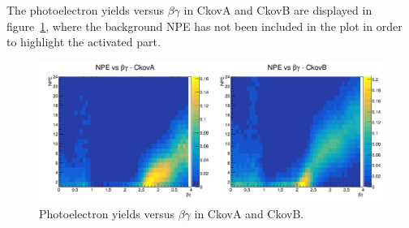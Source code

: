 The photoelectron yields versus $\beta\gamma$ in CkovA and CkovB are displayed in figure~\ref{fig:ckov_betagamma}, where the background NPE has not been included in the plot in order to highlight the activated part.






\begin{figure}[htb!]
  \begin{center}
    \includegraphics[width=0.90\columnwidth]{./03-Ckov/Figures/scatter_betagamma.png}
    \caption{Photoelectron yields versus $\beta\gamma$ in CkovA and CkovB.}
    \label{fig:ckov_betagamma}
  \end{center}
\end{figure}

